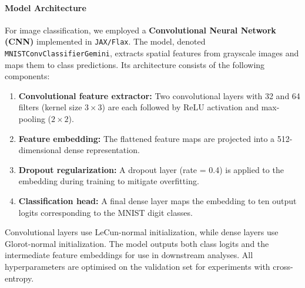 \paragraph{Model Architecture}
For image classification, we employed a \textbf{Convolutional Neural Network (CNN)} implemented in \texttt{JAX/Flax}. The model, denoted \texttt{MNISTConvClassifierGemini}, extracts spatial features from grayscale images and maps them to class predictions. Its architecture consists of the following components:
\begin{enumerate}
\item \textbf{Convolutional feature extractor:} Two convolutional layers with 32 and 64 filters (kernel size $3 \times 3$) are each followed by ReLU activation and max-pooling ($2 \times 2$).
\item \textbf{Feature embedding:} The flattened feature maps are projected into a 512-dimensional dense representation.
\item \textbf{Dropout regularization:} A dropout layer (rate = 0.4) is applied to the embedding during training to mitigate overfitting.
\item \textbf{Classification head:} A final dense layer maps the embedding to ten output logits corresponding to the MNIST digit classes.
\end{enumerate}
Convolutional layers use LeCun-normal initialization, while dense layers use Glorot-normal initialization. The model outputs both class logits and the intermediate feature embeddings for use in downstream analyses. All hyperparameters are optimised on the validation set for experiments with cross-entropy.